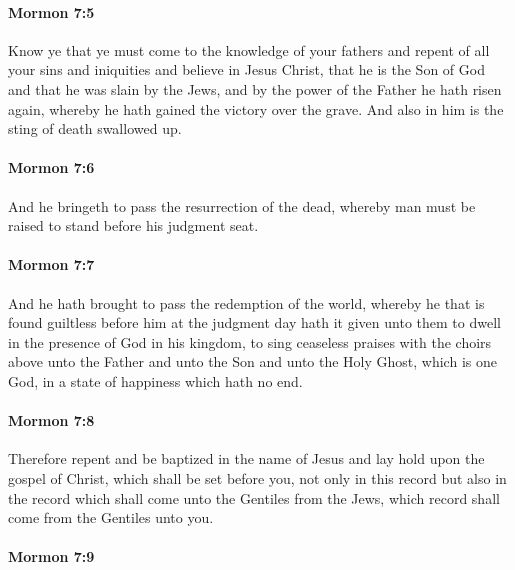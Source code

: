 		\paragraph{Mormon 7:5} %
			\label{MORMON-7-5}

			Know ye that ye must come to the knowledge of your fathers
			and repent of all your sins and iniquities
			and believe in Jesus Christ,
			that he is the Son of God
			and that he was slain by the Jews,
			and by the power of the Father he hath risen again,
			whereby he hath gained the victory over the grave.
			And also in him is the sting of death swallowed up.

		\paragraph{Mormon 7:6} %
			\label{MORMON-7-6}

			And he bringeth to pass the resurrection of the dead,
			whereby man must be raised to stand before his judgment seat.

		\paragraph{Mormon 7:7} %
			\label{MORMON-7-7}

			And he hath brought to pass the redemption of the world,
			whereby he that is found guiltless before him at the judgment day
			hath it given unto them to dwell in the presence of God in his kingdom,
			to sing ceaseless praises with the choirs above
			unto the Father and unto the Son and unto the Holy Ghost,
			which is one God,
			in a state of happiness which hath no end.

		\paragraph{Mormon 7:8} %
			\label{MORMON-7-8}

			Therefore repent and be baptized in the name of Jesus
			and lay hold upon the gospel of Christ,
			which shall be set before you,
			not only in this record but also in the record
			which shall come unto the Gentiles from the Jews,
			which record shall come from the Gentiles unto you.

		\paragraph{Mormon 7:9} %
			\label{MORMON-7-9}

